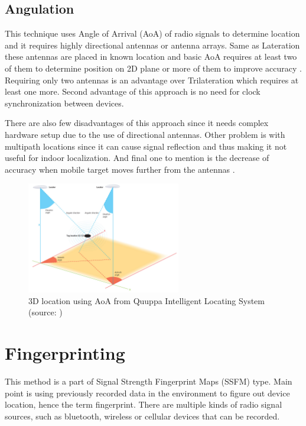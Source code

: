 \subsection{Angulation}\label{sec:Angulation}
This technique uses Angle of Arrival (AoA) of radio signals to determine location and it requires highly directional antennas or antenna arrays. Same as Lateration these antennas are placed in known location and basic AoA requires at least two of them to determine position on 2D plane or more of them to improve accuracy \cite{RAinWILTaS}. Requiring only two antennas is an advantage over Trilateration which requires at least one more. Second advantage of this approach is no need for clock synchronization between devices.

There are also few disadvantages of this approach since it needs complex hardware setup due to the use of directional antennas. Other problem is with multipath locations since it can cause signal reflection and thus making it not useful for indoor localization. And final one to mention is the decrease of accuracy when mobile target moves further from the antennas \cite{AoA, RofAoA}.

\begin{figure}[h!]
	\begin{centering}
		\includegraphics[width=0.6\textwidth]{img/angulation}
		\par\end{centering}
	\caption{3D location using AoA from Quuppa Intelligent Locating System (source: \cite{QAoA})\label{fig:AoAQuuppa}}
	\label{fig03c02}
\end{figure}

\section{Fingerprinting}\label{sec:Fingerprinting}
This method is a part of Signal Strength Fingerprint Maps (SSFM) type. Main point is using previously recorded data in the environment to figure out device location, hence the term fingerprint. There are multiple kinds of radio signal sources, such as bluetooth, wireless or cellular devices that can be recorded.

